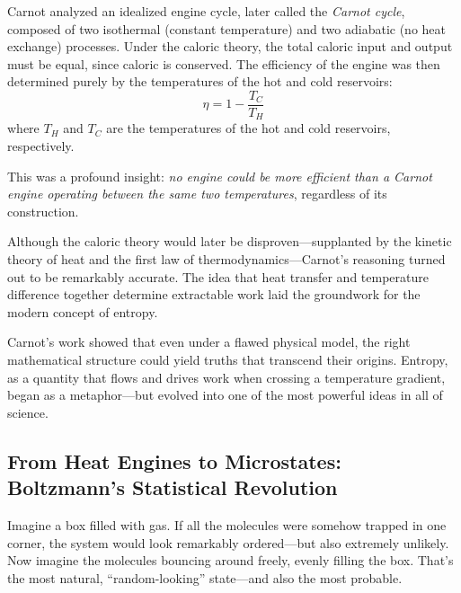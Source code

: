 Carnot analyzed an idealized engine cycle, later called the \emph{Carnot cycle}, composed of two isothermal (constant temperature) and two adiabatic (no heat exchange) processes. Under the caloric theory, the total caloric input and output must be equal, since caloric is conserved. The efficiency of the engine was then determined purely by the temperatures of the hot and cold reservoirs:
\[
\eta = 1 - \frac{T_C}{T_H}
\]
where \( T_H \) and \( T_C \) are the temperatures of the hot and cold reservoirs, respectively.

This was a profound insight: \emph{no engine could be more efficient than a Carnot engine operating between the same two temperatures}, regardless of its construction.










Although the caloric theory would later be disproven—supplanted by the kinetic theory of heat and the first law of thermodynamics—Carnot’s reasoning turned out to be remarkably accurate. The idea that heat transfer and temperature difference together determine extractable work laid the groundwork for the modern concept of entropy.

Carnot’s work showed that even under a flawed physical model, the right mathematical structure could yield truths that transcend their origins. Entropy, as a quantity that flows and drives work when crossing a temperature gradient, began as a metaphor—but evolved into one of the most powerful ideas in all of science.






\subsection{From Heat Engines to Microstates: Boltzmann’s Statistical Revolution}

Imagine a box filled with gas. If all the molecules were somehow trapped in one corner, the system would look remarkably ordered—but also extremely unlikely. Now imagine the molecules bouncing around freely, evenly filling the box. That’s the most natural, “random-looking” state—and also the most probable.

